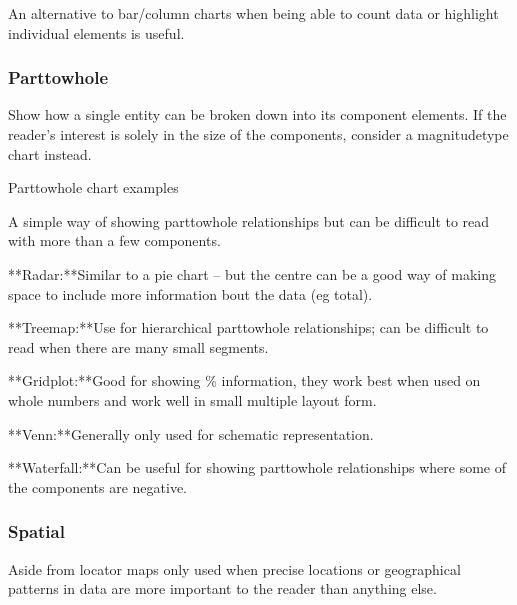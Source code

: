 \documentclass[letterpaper,10pt,english]{jupyterBook}
\begin{document}
\sphinxAtStartPar
{} An alternative to bar/column charts when being able to count data or highlight individual elements is useful.


\subsubsection{Part\sphinxhyphen{}to\sphinxhyphen{}whole}
\label{\detokenize{part1/communication:part-to-whole}}
\sphinxAtStartPar
Show how a single entity can be broken down into its component elements. If the reader’s interest is solely in the size of the components, consider a magnitude\sphinxhyphen{}type chart instead.

\sphinxAtStartPar
{}

\sphinxAtStartPar
Part\sphinxhyphen{}to\sphinxhyphen{}whole chart examples

\sphinxAtStartPar
{} A simple way of showing part\sphinxhyphen{}to\sphinxhyphen{}whole relationships but can be difficult to read with more than a few components.

\sphinxAtStartPar
{}**Radar:**Similar to a pie chart – but the centre can be a good way of making space to include more information bout the data (eg total).

\sphinxAtStartPar
{}**Treemap:**Use for hierarchical part\sphinxhyphen{}to\sphinxhyphen{}whole relationships; can be difficult to read when there are many small segments.

\sphinxAtStartPar
{}**Gridplot:**Good for showing \% information, they work best when used on whole numbers and work well in small multiple layout form.

\sphinxAtStartPar
{}**Venn:**Generally only used for schematic representation.

\sphinxAtStartPar
{}**Waterfall:**Can be useful for showing part\sphinxhyphen{}to\sphinxhyphen{}whole relationships where some of the components are negative.


\subsubsection{Spatial}
\label{\detokenize{part1/communication:spatial}}
\sphinxAtStartPar
Aside from locator maps only used when precise locations or geographical patterns in data are more important to the reader than anything else.
\end{document}
